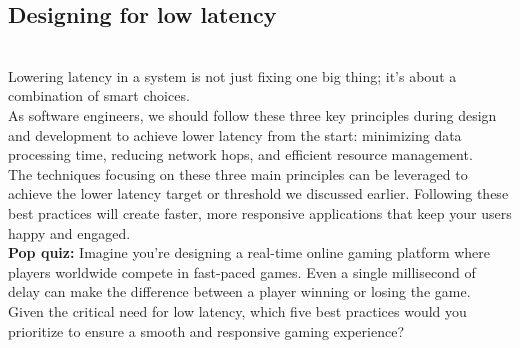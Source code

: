 \subsection{Designing for low latency}\label{PcYfdf8LUT8iWe0uLI808}
\\
Lowering latency in a system is not just fixing one big thing; it's about a combination of smart choices.
\\
As software engineers, we should follow these three key principles during design and development to achieve lower latency from the start: minimizing data processing time, reducing network hops, and efficient resource management.
\\
The techniques focusing on these three main principles can be leveraged to achieve the lower latency target or threshold we discussed earlier. Following these best practices will create faster, more responsive applications that keep your users happy and engaged.
\\
\textbf{Pop quiz:} Imagine you're designing a real-time online gaming platform where players worldwide compete in fast-paced games. Even a single millisecond of delay can make the difference between a player winning or losing the game.
\\
Given the critical need for low latency, which five best practices would you prioritize to ensure a smooth and responsive gaming experience?

